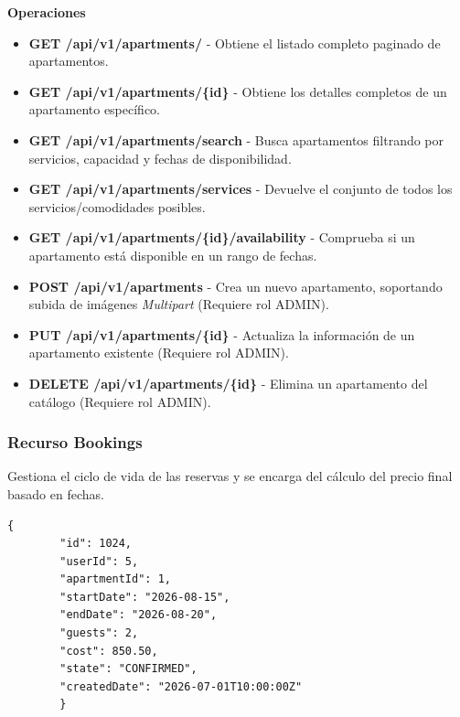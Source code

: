         \textbf{Operaciones}
        \begin{itemize}
            \item \textbf{GET /api/v1/apartments/} - Obtiene el listado completo paginado de apartamentos.
            \item \textbf{GET /api/v1/apartments/\{id\}} - Obtiene los detalles completos de un apartamento específico.
            \item \textbf{GET /api/v1/apartments/search} - Busca apartamentos filtrando por servicios, capacidad y fechas de disponibilidad.
            \item \textbf{GET /api/v1/apartments/services} - Devuelve el conjunto de todos los servicios/comodidades posibles.
            \item \textbf{GET /api/v1/apartments/\{id\}/availability} - Comprueba si un apartamento está disponible en un rango de fechas.
            \item \textbf{POST /api/v1/apartments} - Crea un nuevo apartamento, soportando subida de imágenes \textit{Multipart} (Requiere rol ADMIN).
            \item \textbf{PUT /api/v1/apartments/\{id\}} - Actualiza la información de un apartamento existente (Requiere rol ADMIN).
            \item \textbf{DELETE /api/v1/apartments/\{id\}} - Elimina un apartamento del catálogo (Requiere rol ADMIN).
        \end{itemize}

    \subsubsection{Recurso Bookings}
        Gestiona el ciclo de vida de las reservas y se encarga del cálculo del precio final basado en fechas.
        \begin{lstlisting}[basicstyle=\jsonbasicfont,frame=single,backgroundcolor=\color{white},rulecolor=\color{black},framerule=0.5pt,numbers=none]
        {
        "id": 1024,
        "userId": 5,
        "apartmentId": 1,
        "startDate": "2026-08-15",
        "endDate": "2026-08-20",
        "guests": 2,
        "cost": 850.50,
        "state": "CONFIRMED",
        "createdDate": "2026-07-01T10:00:00Z"
        }
        \end{lstlisting}

